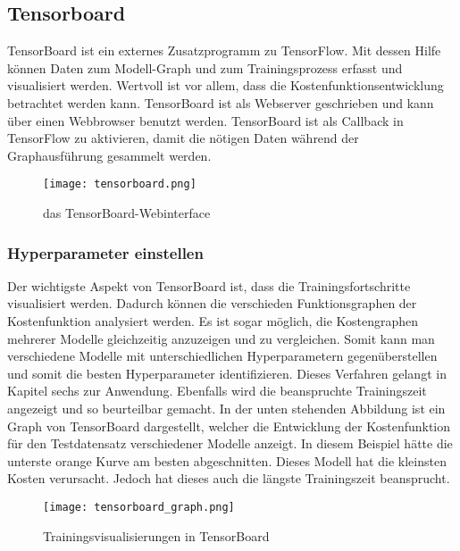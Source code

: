 \subsection{Tensorboard}
TensorBoard ist ein externes Zusatzprogramm zu TensorFlow. Mit dessen Hilfe können
Daten zum Modell-Graph und zum Trainingsprozess erfasst und visualisiert werden.
Wertvoll ist vor allem, dass die Kostenfunktionsentwicklung betrachtet werden
kann.
\para{}
TensorBoard ist als Webserver geschrieben und kann über einen Webbrowser
benutzt werden.
TensorBoard ist als Callback in TensorFlow zu aktivieren, damit die
nötigen Daten während der Graphausführung gesammelt werden.

\begin{figure}[h!]
  \centering
  \texttt{[image: tensorboard.png]}
  \caption{das TensorBoard-Webinterface}
\end{figure}

\subsubsection{Hyperparameter einstellen}
Der wichtigste Aspekt von TensorBoard ist, dass die Trainingsfortschritte
visualisiert werden.
Dadurch können die verschieden Funktionsgraphen der Kostenfunktion analysiert werden.
Es ist sogar möglich, die Kostengraphen mehrerer Modelle gleichzeitig anzuzeigen und zu vergleichen.
Somit kann man verschiedene Modelle mit unterschiedlichen Hyperparametern
gegenüberstellen und somit die besten Hyperparameter identifizieren.
Dieses Verfahren gelangt in Kapitel sechs zur Anwendung.
Ebenfalls wird die beanspruchte Trainingszeit angezeigt und so beurteilbar gemacht.
\para{}
In der unten stehenden Abbildung ist ein Graph von TensorBoard dargestellt,
welcher die Entwicklung der Kostenfunktion für den Testdatensatz verschiedener
Modelle anzeigt. In diesem Beispiel hätte die unterste orange Kurve am besten
abgeschnitten. Dieses Modell hat die kleinsten Kosten verursacht. Jedoch hat
dieses auch die längste Trainingszeit beansprucht.

\begin{figure}[h!]
  \centering
  \texttt{[image: tensorboard\_graph.png]}
  \caption{Trainingsvisualisierungen in TensorBoard}
\end{figure}
\para{}

